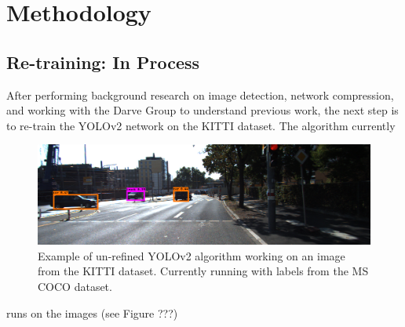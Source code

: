 \documentclass[10pt,letterpaper]{article}
\begin{document}
	
	\section{Methodology}
	\subsection{Re-training: In Process}
	After performing background research on image detection, network compression, and working with the Darve Group to understand previous work, the next step is to re-train the YOLOv2 network on the KITTI dataset. The algorithm currently 
	
	\begin{figure}
		\centering
		\includegraphics[width=\linewidth]{images/kitti_test}
		\caption{Example of un-refined YOLOv2 algorithm working on an image from the KITTI dataset. Currently running with labels from the MS COCO dataset.}
	\label{fig:kitti_test}
\end{figure}
runs on the images (see Figure ???)
	
	
	
	
	
\end{document}
